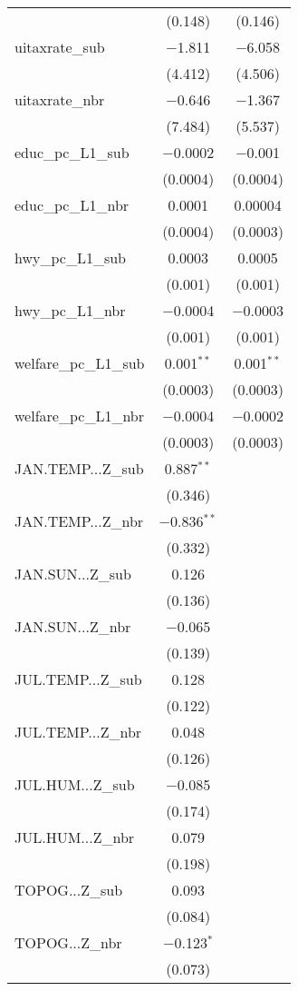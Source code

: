 \begin{table}[!htbp]
\begin{tabular}{@{\extracolsep{5pt}}lcc}
  & (0.148) & (0.146) \\ 
  uitaxrate\_sub & $-$1.811 & $-$6.058 \\ 
  & (4.412) & (4.506) \\ 
  uitaxrate\_nbr & $-$0.646 & $-$1.367 \\ 
  & (7.484) & (5.537) \\ 
  educ\_pc\_L1\_sub & $-$0.0002 & $-$0.001 \\ 
  & (0.0004) & (0.0004) \\ 
  educ\_pc\_L1\_nbr & 0.0001 & 0.00004 \\ 
  & (0.0004) & (0.0003) \\ 
  hwy\_pc\_L1\_sub & 0.0003 & 0.0005 \\ 
  & (0.001) & (0.001) \\ 
  hwy\_pc\_L1\_nbr & $-$0.0004 & $-$0.0003 \\ 
  & (0.001) & (0.001) \\ 
  welfare\_pc\_L1\_sub & 0.001$^{**}$ & 0.001$^{**}$ \\ 
  & (0.0003) & (0.0003) \\ 
  welfare\_pc\_L1\_nbr & $-$0.0004 & $-$0.0002 \\ 
  & (0.0003) & (0.0003) \\ 
  JAN.TEMP...Z\_sub & 0.887$^{**}$ &  \\ 
  & (0.346) &  \\ 
  JAN.TEMP...Z\_nbr & $-$0.836$^{**}$ &  \\ 
  & (0.332) &  \\ 
  JAN.SUN...Z\_sub & 0.126 &  \\ 
  & (0.136) &  \\ 
  JAN.SUN...Z\_nbr & $-$0.065 &  \\ 
  & (0.139) &  \\ 
  JUL.TEMP...Z\_sub & 0.128 &  \\ 
  & (0.122) &  \\ 
  JUL.TEMP...Z\_nbr & 0.048 &  \\ 
  & (0.126) &  \\ 
  JUL.HUM...Z\_sub & $-$0.085 &  \\ 
  & (0.174) &  \\ 
  JUL.HUM...Z\_nbr & 0.079 &  \\ 
  & (0.198) &  \\ 
  TOPOG...Z\_sub & 0.093 &  \\ 
  & (0.084) &  \\ 
  TOPOG...Z\_nbr & $-$0.123$^{*}$ &  \\ 
  & (0.073) &  \\ 

\end{tabular}
\end{table}
